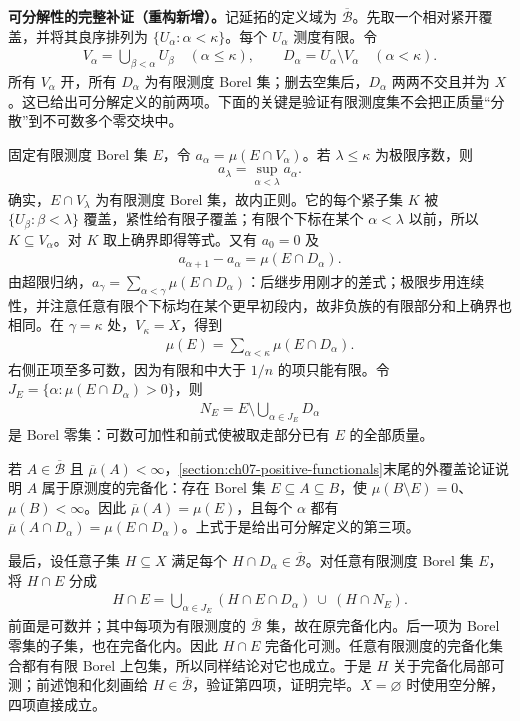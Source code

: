 \documentclass[../../main.tex]{subfiles}
\begin{document}
\begin{remark}
\textbf{可分解性的完整补证（重构新增）。}记延拓的定义域为 $\overline{\mathscr B}$。先取一个相对紧开覆盖，并将其良序排列为 $\{U_\alpha:\alpha<\kappa\}$。每个 $U_\alpha$ 测度有限。令
\begin{align*}
V_\alpha=\bigcup_{\beta<\alpha}U_\beta\quad(\alpha\leqslant\kappa),
\qquad D_\alpha=U_\alpha\setminus V_\alpha\quad(\alpha<\kappa).
\end{align*}
所有 $V_\alpha$ 开，所有 $D_\alpha$ 为有限测度 Borel 集；删去空集后，$D_\alpha$ 两两不交且并为 $X$。这已给出可分解定义的前两项。下面的关键是验证有限测度集不会把正质量“分散”到不可数多个零交块中。

固定有限测度 Borel 集 $E$，令 $a_\alpha=\mu(E\cap V_\alpha)$。若 $\lambda\leqslant\kappa$ 为极限序数，则
\begin{align*}
a_\lambda=\sup_{\alpha<\lambda}a_\alpha.
\end{align*}
确实，$E\cap V_\lambda$ 为有限测度 Borel 集，故内正则。它的每个紧子集 $K$ 被 $\{U_\beta:\beta<\lambda\}$ 覆盖，紧性给有限子覆盖；有限个下标在某个 $\alpha<\lambda$ 以前，所以 $K\subseteq V_\alpha$。对 $K$ 取上确界即得等式。又有 $a_0=0$ 及
\begin{align*}
a_{\alpha+1}-a_\alpha=\mu(E\cap D_\alpha).
\end{align*}
由超限归纳，$a_\gamma=\sum_{\alpha<\gamma}\mu(E\cap D_\alpha)$：后继步用刚才的差式；极限步用连续性，并注意任意有限个下标均在某个更早初段内，故非负族的有限部分和上确界也相同。在 $\gamma=\kappa$ 处，$V_\kappa=X$，得到
\begin{align*}
\mu(E)=\sum_{\alpha<\kappa}\mu(E\cap D_\alpha).
\end{align*}
右侧正项至多可数，因为有限和中大于 $1/n$ 的项只能有限。令 $J_E=\{\alpha:\mu(E\cap D_\alpha)>0\}$，则
\begin{align*}
N_E=E\setminus\bigcup_{\alpha\in J_E}D_\alpha
\end{align*}
是 Borel 零集：可数可加性和前式使被取走部分已有 $E$ 的全部质量。

若 $A\in\overline{\mathscr B}$ 且 $\overline\mu(A)<\infty$，\cref{section:ch07-positive-functionals}末尾的外覆盖论证说明 $A$ 属于原测度的完备化：存在 Borel 集 $E\subseteq A\subseteq B$，使 $\mu(B\setminus E)=0$、$\mu(B)<\infty$。因此 $\overline\mu(A)=\mu(E)$，且每个 $\alpha$ 都有 $\overline\mu(A\cap D_\alpha)=\mu(E\cap D_\alpha)$。上式于是给出可分解定义的第三项。

最后，设任意子集 $H\subseteq X$ 满足每个 $H\cap D_\alpha\in\overline{\mathscr B}$。对任意有限测度 Borel 集 $E$，将 $H\cap E$ 分成
\begin{align*}
H\cap E=
\bigcup_{\alpha\in J_E}(H\cap E\cap D_\alpha)\ \cup\ (H\cap N_E).
\end{align*}
前面是可数并；其中每项为有限测度的 $\overline{\mathscr B}$ 集，故在原完备化内。后一项为 Borel 零集的子集，也在完备化内。因此 $H\cap E$ 完备化可测。任意有限测度的完备化集合都有有限 Borel 上包集，所以同样结论对它也成立。于是 $H$ 关于完备化局部可测；前述饱和化刻画给 $H\in\overline{\mathscr B}$，验证第四项，证明完毕。$X=\varnothing$ 时使用空分解，四项直接成立。


\end{remark}
\end{document}
